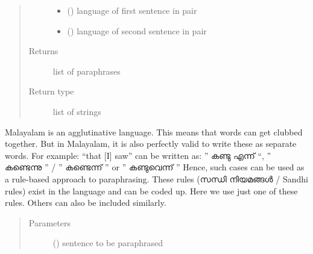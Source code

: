 \documentclass[letterpaper,10pt,english]{sphinxmanual}
\begin{document}
\begin{fulllineitems}
\begin{fulllineitems}
\begin{quote}
\begin{description}
\begin{itemize}
\item {} 
 () \textendash{} language of first sentence in pair

\item {} 
 () \textendash{} language of second sentence in pair

\end{itemize}

\item[{Returns}] \leavevmode
list of paraphrases

\item[{Return type}] \leavevmode
list of strings

\end{description}\end{quote}

\end{fulllineitems}


\begin{fulllineitems}
\label{\detokenize{ParaphraseDatasetCreation.Malayalam:ParaphraseDatasetCreation.Malayalam.Positive.PositiveParaphrases.morphology_and_agglutination_based_paraphrasing}}
Malayalam is an agglutinative language. This means that words can get 
clubbed together. But in Malayalam, it is also perfectly valid to write 
these as separate words. For example: “that {[}I{]} saw” can be written as:
” കണ്ടു എന്ന് “, ” കണ്ടെന്നു ” / ” കണ്ടെന്ന് ” or  ” കണ്ടുവെന്ന് ”
Hence, such cases can be used as a rule-based approach to paraphrasing. 
These rules (സന്ധി നിയമങ്ങൾ / Sandhi rules) exist in the language and can 
be coded up. Here we use just one of these rules. Others can also be 
included similarly.
\begin{quote}\begin{description}
\item[{Parameters}] \leavevmode
{} () \textendash{} sentence to be paraphrased


\end{description}
\end{quote}
\end{fulllineitems}
\end{fulllineitems}
\end{document}
